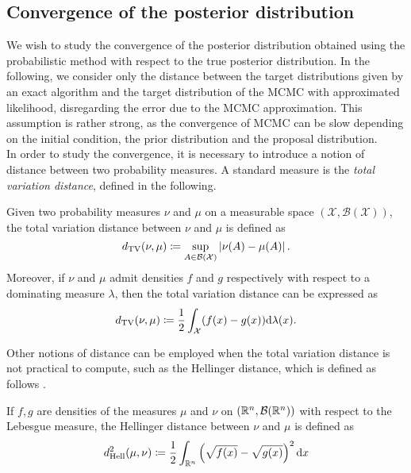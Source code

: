 \subsection{Convergence of the posterior distribution}

We wish to study the convergence of the posterior distribution obtained using the probabilistic method with respect to the true posterior distribution. In the following, we consider only the distance between the target distributions given by an exact algorithm and the target distribution of the MCMC with approximated likelihood, disregarding the error due to the MCMC approximation. This assumption is rather strong, as the convergence of MCMC can be slow depending on the initial condition, the prior distribution and the proposal distribution. \\
In order to study the convergence, it is necessary to introduce a notion of distance between two probability measures. A standard measure is the \textit{total variation distance}, defined in the following.
\begin{definition} Given two probability measures $\nu$ and $\mu$ on a measurable space $(\mathcal{X}, \mathcal{B}(\mathcal{X}))$, the total variation distance between $\nu$ and $\mu$ is defined as
\begin{equation}
	d_{\mathrm{TV}}(\nu,\mu) \coloneqq \sup_{A\in \mathcal{B}(\mathcal{X})} \left|\nu(A) - \mu(A)\right|.
\end{equation}
Moreover, if $\nu$ and $\mu$ admit densities $f$ and $g$ respectively with respect to a dominating measure $\lambda$, then the total variation distance can be expressed as
\begin{equation}
	d_{\mathrm{TV}}(\nu,\mu) \coloneqq \frac{1}{2} \int_{\mathcal{X}} (f(x) - g(x))\dd \lambda(x).
\end{equation}
\end{definition}
\noindent Other notions of distance can be employed when the total variation distance is not practical to compute, such as the Hellinger distance, which is defined as follows \cite{GiS02}.
\begin{definition} If $f, g$ are densities of the measures $\mu$ and $\nu$ on $(\mathbb{R}^n, \mathcal{B}(\mathbb{R}^n))$ with respect to the Lebesgue measure, the Hellinger distance between $\nu$ and $\mu$ is defined as
\begin{equation}
	d_{\mathrm{Hell}}^2(\mu, \nu) \coloneqq \frac{1}{2}\int_{\mathbb{R}^n}\left(\sqrt{f(x)} - \sqrt{g(x)}\right)^2\dd x
\end{equation}
\end{definition}
